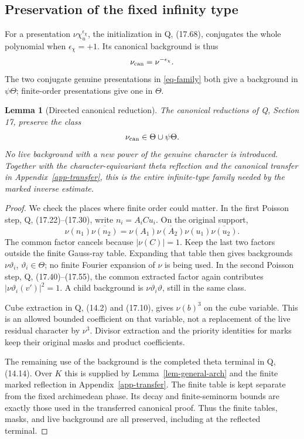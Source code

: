 \documentclass[11pt,a4paper]{article}
\newtheorem{lemma}[theorem]{Lemma}
\theoremstyle{remark}\newtheorem{remark}[theorem]{Remark}
\numberwithin{equation}{section}
\begin{document}
\subsection{Preservation of the fixed infinity type}

For a presentation $\nu\chi_u^{\epsilon_\chi}$, the initialization
in Q, (17.68), conjugates the whole polynomial when
$\epsilon_\chi=+1$. Its canonical background is thus
\begin{equation}\label{eq-direction}
 \nu_{\rm can}=\nu^{-\epsilon_\chi}.
\end{equation}
The two conjugate genuine presentations in \eqref{eq-family}
both give a background in $\psi\Theta$; finite-order presentations
give one in $\Theta$.

\begin{lemma}[Directed canonical reduction]\label{lem-directed}
The canonical reductions of Q, Section 17, preserve the class
\[
 \nu_{\rm can}\in\Theta\cup\psi\Theta.
\]
No live background with a new power of the genuine character
is introduced. Together with the character-equivariant theta reflection and the
canonical transfer in Appendix~\ref{app-transfer}, this is the entire
infinite-type family needed by the marked inverse estimate.
\end{lemma}

\begin{proof}
We check the places where finite order could matter. In the first
Poisson step, Q, (17.22)--(17.30), write
$n_i=A_i C u_i$. On the original support,
\[
 \nu(n_1)\overline{\nu(n_2)}
 =\nu(A_1)\overline{\nu(A_2)}
       \nu(u_1)\overline{\nu(u_2)}.
\]
The common factor cancels because $|\nu(C)|=1$. Keep the last two
factors outside the finite Gauss-ray table. Expanding that table
then gives backgrounds $\nu\vartheta_i$, $\vartheta_i\in\Theta$;
no finite Fourier expansion of $\nu$ is being used. In the second
Poisson step, Q, (17.40)--(17.55), the common extracted factor again
contributes $|\nu\vartheta_i(v')|^2=1$. A child background is
$\nu\vartheta_i\vartheta$, still in the same class.

Cube extraction in Q, (14.2) and (17.10), gives $\nu(b)^3$
on the cube variable. This is an allowed bounded coefficient on
that variable, not a replacement of the live residual character
by $\nu^3$. Divisor extraction and the priority identities for
marks keep their original masks and product coefficients.

The remaining use of the background is the completed theta
terminal in Q, (14.14). Over $K$ this is supplied by
Lemma~\ref{lem-general-arch} and the finite marked reflection in
Appendix~\ref{app-transfer}. The finite table is kept separate from the fixed
archimedean phase. Its decay and finite-seminorm
bounds are exactly those used in the transferred canonical proof.
Thus the finite tables, masks, and live background are all
preserved, including at the reflected terminal.
\end{proof}
\end{document}
